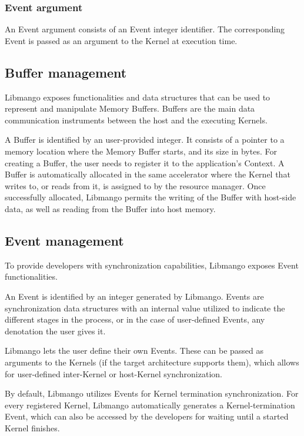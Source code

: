 \subsubsection{Event argument}
An Event argument consists of an Event integer identifier. The corresponding Event is passed as an argument to the Kernel at execution time.

\subsection{Buffer management}
Libmango exposes functionalities and data structures that can be used to represent and manipulate Memory Buffers. Buffers are the main data communication instruments between the host and the executing Kernels. 

A Buffer is identified by an user-provided integer. It consists of a pointer to a memory location where the Memory Buffer starts, and its size in bytes. 
For creating a Buffer, the user needs to register it to the application's Context. A Buffer is automatically allocated in the same accelerator where the Kernel that writes to, or reads from it, is assigned to by the resource manager.
Once successfully allocated, Libmango permits the writing of the Buffer with host-side data, as well as reading from the Buffer into host memory.


\subsection{Event management}
To provide developers with synchronization capabilities, Libmango exposes Event functionalities.

An Event is identified by an integer generated by Libmango. Events are synchronization data structures with an internal value utilized to indicate the different stages in the process, or in the case of user-defined Events, any denotation the user gives it.

Libmango lets the user define their own Events. These can be passed as arguments to the Kernels (if the target architecture supports them), which allows for user-defined inter-Kernel or host-Kernel synchronization.

By default, Libmango utilizes Events for Kernel termination synchronization. For every registered Kernel, Libmango automatically generates a Kernel-termination Event, which can also be accessed by the developers for waiting until a started Kernel finishes.

